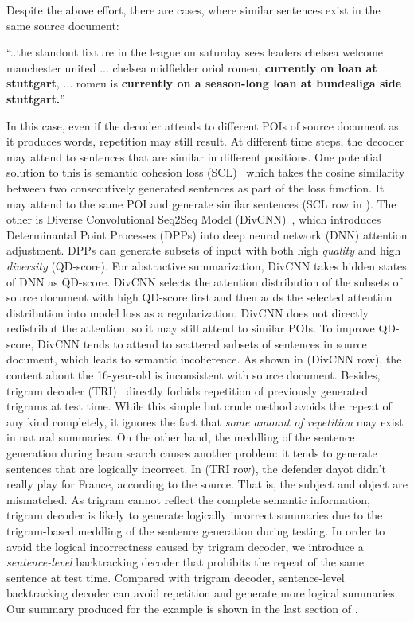 Despite the above effort, there are cases, where similar sentences 
exist in the same source document:
\begin{example}
\label{ex:repeatsrc}
\small{``..the standout fixture in the league on saturday sees leaders 
	   chelsea welcome manchester united ... chelsea midfielder oriol romeu, 
\textbf{currently on loan at stuttgart}, ... romeu is 
\textbf{currently on a season-long loan at bundesliga side stuttgart.}''} 
\end{example}

In this case, even if the decoder attends to different POIs of 
source document as it produces words, repetition may still result.  
At different time steps, 
the decoder may attend 
to sentences that are similar in different positions.
One potential solution to this is semantic cohesion loss (SCL)~\citep{elikyilmazBHC18}
which takes the cosine similarity between two consecutively generated sentences
as part of the loss function. It may attend to the same POI
and generate similar sentences (SCL row in ).  
The other is Diverse Convolutional Seq2Seq
Model (DivCNN)~\citep{DivC2C19}, 
which introduces Determinantal Point Processes (DPPs) \citep{DPPs11} into deep neural network (DNN) attention adjustment.
DPPs can generate subsets of input with both high {\em quality} and high {\em diversity} (QD-score).
For abstractive summarization, DivCNN takes hidden states of DNN as QD-score.
DivCNN selects the attention distribution of the subsets of source document with high QD-score first
 and then adds the selected attention distribution into model loss as a regularization.
DivCNN does not directly redistribut the attention,
so it may still attend to similar POIs.
To improve QD-score, DivCNN tends to attend to scattered subsets of sentences in source document,
which leads to semantic incoherence. 
As shown in  (DivCNN row),
the content about the 16-year-old 
is inconsistent with source document.
Besides, trigram decoder (TRI)~\citep{PaulusXS17} 
directly forbids repetition of previously generated trigrams at test time. 
While this simple but crude method avoids the repeat of any kind
completely, 
it ignores the fact that \textit{some amount of repetition} may exist
in natural summaries.  
On the other hand, the meddling of the sentence generation during beam search causes another problem: 
it tends to generate sentences that are logically incorrect. 
In  (TRI row), the defender dayot didn't
really play for France, according to the source.
That is, the subject and object are mismatched.
As trigram cannot reflect the complete semantic information, 
trigram decoder is likely to generate logically incorrect summaries 
due to the trigram-based meddling of the sentence generation
during testing. 
In order to avoid the logical incorrectness caused by trigram decoder,
we introduce  a {\em sentence-level} backtracking decoder
that prohibits the repeat of the same sentence at test time. 
Compared with trigram decoder, 
sentence-level backtracking decoder can avoid repetition and generate more logical summaries. 
Our summary produced for the example is shown in the last section of 
.


